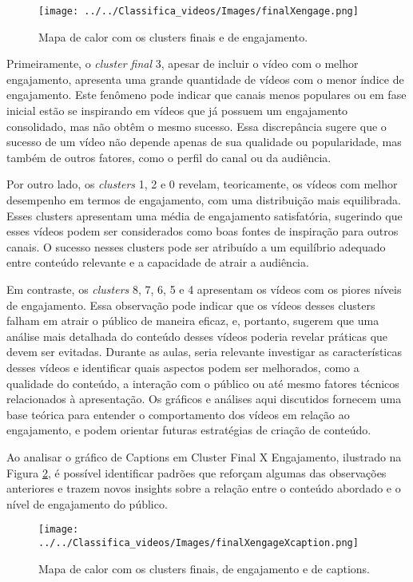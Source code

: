 \documentclass[manuscript,screen,review]{acmart}
\begin{document}
\begin{figure}[ht]
    \centering
    \texttt{[image: ../../Classifica\_videos/Images/finalXengage.png]}
    \caption{Mapa de calor com os clusters finais e de engajamento.}
    \label{fig:heatmap}
\end{figure}

Primeiramente, o \textit{cluster final} 3, apesar de incluir o vídeo com o melhor engajamento, apresenta uma grande quantidade de vídeos com o menor índice de engajamento. Este fenômeno pode indicar que canais menos populares ou em fase inicial estão se inspirando em vídeos que já possuem um engajamento consolidado, mas não obtêm o mesmo sucesso. Essa discrepância sugere que o sucesso de um vídeo não depende apenas de sua qualidade ou popularidade, mas também de outros fatores, como o perfil do canal ou da audiência.

Por outro lado, os \textit{clusters} 1, 2 e 0 revelam, teoricamente, os vídeos com melhor desempenho em termos de engajamento, com uma distribuição mais equilibrada. Esses clusters apresentam uma média de engajamento satisfatória, sugerindo que esses vídeos podem ser considerados como boas fontes de inspiração para outros canais. O sucesso nesses clusters pode ser atribuído a um equilíbrio adequado entre conteúdo relevante e a capacidade de atrair a audiência.

Em contraste, os \textit{clusters} 8, 7, 6, 5 e 4 apresentam os vídeos com os piores níveis de engajamento. Essa observação pode indicar que os vídeos desses clusters falham em atrair o público de maneira eficaz, e, portanto, sugerem que uma análise mais detalhada do conteúdo desses vídeos poderia revelar práticas que devem ser evitadas. Durante as aulas, seria relevante investigar as características desses vídeos e identificar quais aspectos podem ser melhorados, como a qualidade do conteúdo, a interação com o público ou até mesmo fatores técnicos relacionados à apresentação. Os gráficos e análises aqui discutidos fornecem uma base teórica para entender o comportamento dos vídeos em relação ao engajamento, e podem orientar futuras estratégias de criação de conteúdo.

Ao analisar o gráfico de Captions em Cluster Final X Engajamento, ilustrado na Figura \ref{fig:captionsFinal}, é possível identificar padrões que reforçam algumas das observações anteriores e trazem novos insights sobre a relação entre o conteúdo abordado e o nível de engajamento do público.

\begin{figure}
    \centering
    \texttt{[image: ../../Classifica\_videos/Images/finalXengageXcaption.png]}
    \caption{Mapa de calor com os clusters finais, de engajamento e de captions.}
    \label{fig:captionsFinal}
\end{figure}
\end{document}
